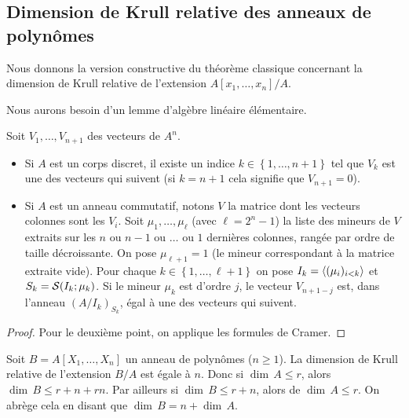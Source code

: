  

\subsection{Dimension de Krull relative des anneaux de polynômes} \label{secextpol} 
Nous donnons la version constructive du théorème classique concernant  
la dimension de Krull relative de l'extension
$A[x_1,\ldots, x_n]/A$.

Nous aurons besoin d'un lemme d'algèbre linéaire élémentaire.

\begin{lemma} 
\label{lemALE} Soit $V_1,\ldots,V_{n+1}$ des vecteurs de 
$A^{n}$. 
\begin{itemize}
\item  Si $A$ est un corps discret, il existe un indice 
$k\in \left\{1,\ldots,n+1\right\}$ tel que
$V_k$ est une \coli des vecteurs qui suivent (si $k=n+1$ cela signifie 
que $V_{n+1}=0$).
\item  Si $A$ est un anneau commutatif, notons $V$ la matrice dont les 
vecteurs colonnes sont les $V_i$. Soit $\mu_1,\ldots,\mu_\ell$
(avec $\ell=2^n-1$) la liste des mineurs de $V$ extraits sur les 
$n$ ou $n-1$ ou $\ldots$ ou $1$  dernières colonnes, rangée par ordre 
de taille décroissante. On pose $\mu_{\ell+1}=1$ 
(le mineur correspondant à la matrice extraite vide).
Pour chaque $k\in\left\{1,\ldots,\ell+1\right\}$ on pose
$I_k=\left\langle{(\mu_i)_{i< k}}\right\rangle$ et $S_k={\cal S}(I_k;\mu_k)$.
Si le mineur $\mu_k$ est d'ordre $j$, le vecteur $V_{n+1-j}$ 
est, dans l'anneau $(A/I_k)_{S_k}$,
égal à une \coli des vecteurs qui suivent.
\end{itemize}
\end{lemma}
\begin{proof}
Pour le deuxième point, on applique les formules de Cramer.
\end{proof}

\begin{proposition} 
\label{propKrRelPol} Soit $B=A[X_1,\ldots, X_n]$  un anneau de polynômes ($n\geq 1$).
La dimension de Krull relative de l'extension
$B/A$ est égale à $n$. 
Donc si  $\dim\, A \le r$, 
alors $\dim\, B\le r+n+rn$. 
Par ailleurs si  $\dim\, B\le r+n$, alors de $\dim\, A \le r$. On abrège cela en disant que $\dim\, B=n+\dim\,A$. 
\end{proposition}


